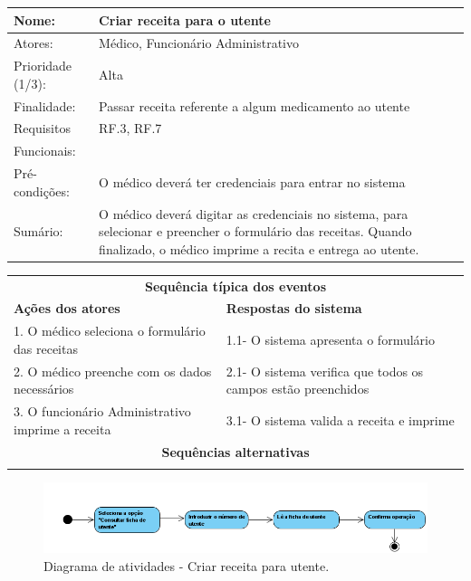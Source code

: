 \documentclass[11pt,a4paper,twoside]{report}
\begin{document}
\begin{center}
	\begin{tabularx}{\textwidth}{|lX|}
		\hline
		\textbf{Nome}: & \textbf{Criar receita para o utente } \\ \hline
		Atores: & Médico, Funcionário Administrativo   \\ \hline
		Prioridade (1/3): & Alta \\ \hline
		Finalidade: & Passar receita referente a algum medicamento ao utente   \\ \hline
		Requisitos & RF.3, RF.7    \\
		Funcionais: & \\
		Pré-condições: & O médico deverá ter credenciais para entrar no sistema   \\
		Sumário: & O médico deverá digitar as credenciais no sistema, para selecionar e preencher o formulário das receitas. Quando finalizado, o médico imprime a recita e entrega ao utente.  \\
		\hline
	\end{tabularx}
	
	\begin{tabularx}{\textwidth}{|XX|}
		\hline
		\multicolumn{2}{|c|}{\textbf{Sequência típica dos eventos} }\\
		\textbf{Ações dos atores}  & \textbf{Respostas do sistema} \\
		1.     O médico seleciona o formulário das receitas   & 1.1- O sistema apresenta o formulário   \\
		2.   O médico preenche com os dados necessários    & 2.1- O sistema verifica que todos os campos estão preenchidos    \\
		3.   O funcionário Administrativo imprime a receita    & 3.1- O sistema valida a receita e imprime  \\
	
		\hline
		\multicolumn{2}{|c|}{\textbf{Sequências alternativas } }\\
		\hline
		\multicolumn{2}{|l|}{  }\\
		\hline
	\end{tabularx}
	
\end{center}

\begin{figure}[H]
	\centering
	\includegraphics[width=0.7\linewidth]{image/Atividades/Criar receita}
	\caption{Diagrama de atividades - Criar receita para utente.}
	\label{fig:criarreceita}
\end{figure}
\end{document}
